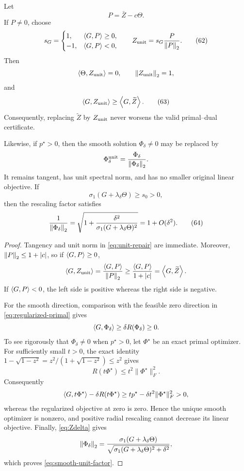\begin{corollary}
\label{cor:unit-repair}
Let
\[
P=\bar Z-c\Theta.
\]
If \(P\ne0\), choose
\[
s_G=
\begin{cases}
1,&\left\langle G,P\right\rangle\ge0,\\
-1,&\left\langle G,P\right\rangle<0,
\end{cases}
\qquad
Z_{\rm unit}=s_G\frac{P}{\left\lVert P\right\rVert_{2}}.
\tag{62}
\label{eq:unit-repair}
\]
Then
\[
\left\langle \Theta,Z_{\rm unit}\right\rangle=0,\qquad
\left\lVert Z_{\rm unit}\right\rVert_{2}=1,
\]
and
\[
\left\langle G,Z_{\rm unit}\right\rangle\ge\left\langle G,\widetilde Z\right\rangle.
\tag{63}
\label{eq:unit-repair-objective}
\]
Consequently, replacing \(\widetilde Z\) by \(Z_{\rm unit}\) never worsens the
valid primal--dual certificate.

Likewise, if \(p^\star>0\), then the smooth solution
\(\Phi_\delta\ne0\) may be replaced by
\[
\Phi_\delta^{\rm unit}
=\frac{\Phi_\delta}{\left\lVert \Phi_\delta\right\rVert_{2}}.
\]
It remains tangent, has unit spectral norm, and has no smaller original
linear objective.  If
\[
\sigma_1(G+\lambda_\delta\Theta)\ge s_0>0,
\]
then the rescaling factor satisfies
\[
\frac{1}{\left\lVert \Phi_\delta\right\rVert_{2}}
=
\sqrt{1+\frac{\delta^2}
{\sigma_1(G+\lambda_\delta\Theta)^2}}
=1+O(\delta^2).
\tag{64}
\label{eq:smooth-unit-factor}
\]
\end{corollary}

\begin{proof}
Tangency and unit norm in \eqref{eq:unit-repair} are immediate.  Moreover,
\(\left\lVert P\right\rVert_{2}\le1+|c|\), so if \(\left\langle G,P\right\rangle\ge0\),
\[
\left\langle G,Z_{\rm unit}\right\rangle
=\frac{\left\langle G,P\right\rangle}{\left\lVert P\right\rVert_{2}}
\ge\frac{\left\langle G,P\right\rangle}{1+|c|}
=\left\langle G,\widetilde Z\right\rangle.
\]
If \(\left\langle G,P\right\rangle<0\), the left side is positive whereas the right side is
negative.

For the smooth direction, comparison with the feasible zero direction in
\eqref{eq:regularized-primal} gives
\[
\left\langle G,\Phi_\delta\right\rangle
\ge\delta R(\Phi_\delta)\ge0.
\]
To see rigorously that \(\Phi_\delta\ne0\) when \(p^\star>0\), let
\(\Phi^\star\) be an exact primal optimizer.  For sufficiently small
\(t>0\), the exact identity
\(1-\sqrt{1-z^2}=z^2/(1+\sqrt{1-z^2})\le z^2\) gives
\[
 R(t\Phi^\star)\le t^2\|\Phi^\star\|_F^2.
\]
Consequently
\[
 \left\langle G,t\Phi^\star\right\rangle-\delta R(t\Phi^\star)
 \ge tp^\star-\delta t^2\|\Phi^\star\|_F^2>0,
\]
whereas the regularized objective at zero is zero.  Hence the unique smooth
optimizer is nonzero, and positive radial rescaling cannot decrease its
linear objective.  Finally,
\eqref{eq:Zdelta} gives
\[
\left\lVert \Phi_\delta\right\rVert_{2}
=
\frac{\sigma_1(G+\lambda_\delta\Theta)}
{\sqrt{\sigma_1(G+\lambda_\delta\Theta)^2+\delta^2}},
\]
which proves \eqref{eq:smooth-unit-factor}.
\end{proof}

